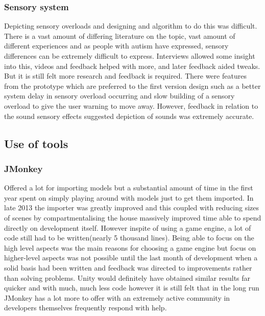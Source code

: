 \documentclass[11pt]{report}
\begin{document}
\subsubsection{Sensory system}
Depicting sensory overloads and designing and algorithm to do this was difficult. There is a vast amount of differing literature on the topic, vast amount of different experiences and as people with autism have expressed, sensory differences can be extremely difficult to express. Interviews allowed some insight into this, videos and feedback helped with more, and later feedback aided tweaks. But it is still felt more research and feedback is required. There were features from the prototype which are preferred to the first version design such as a better system delay in sensory overload occurring and slow building of a sensory overload to give the user warning to move away. However, feedback in relation to the sound sensory effects suggested depiction of sounds was extremely accurate. 


\subsection{Use of tools}

\subsubsection{JMonkey}
Offered a lot for importing models but a substantial amount of time in the first year spent on simply playing around with models just to get them imported. In late 2013 the importer was greatly improved and this coupled with reducing sizes of scenes by compartmentalising the house massively improved time able to spend directly on development itself.
However inspite of using a game engine, a lot of code still had to be written(nearly 5 thousand lines). Being able to focus on the high level aspects was the main reasons for choosing a game engine but focus on higher-level aspects was not possible until the last month of development when a solid basis had been written and feedback was directed to improvements rather than solving problems.
Unity would definitely have obtained similar results far quicker and with much, much less code however it is still felt that in the long run JMonkey has a lot more to offer with an extremely active community in developers themselves frequently respond with help.
\end{document}
